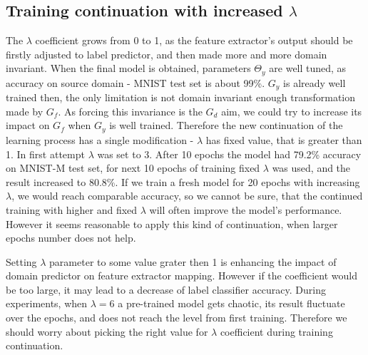 \documentclass{article}
\begin{document}
\subsection{Training continuation with increased $\lambda$}
The $\lambda$ coefficient grows from 0 to 1, as the feature extractor's output should be firstly adjusted to label predictor, and then made more and more domain invariant. When the final model is obtained, parameters $\Theta_{y}$ are well tuned, as accuracy on source domain - MNIST test set is about 99\%. $G_{y}$ is already well trained then, the only limitation is not domain invariant enough transformation made by $G_{f}$. As forcing this invariance is the $G_{d}$ aim, we could try to increase its impact on $G_{f}$ when $G_{y}$ is well trained. Therefore the new continuation of the learning process has a single modification - $\lambda$ has fixed value, that is greater than 1. In first attempt $\lambda$ was set to 3. After 10 epochs the model had 79.2\% accuracy on MNIST-M test set, for next 10 epochs of training fixed $\lambda$ was used, and the result increased to 80.8\%. If we train a fresh model for 20 epochs with increasing $\lambda$, we would reach comparable accuracy, so we cannot be sure, that the continued training with higher and fixed $\lambda$ will often improve the model's performance. However it seems reasonable to apply this kind of continuation, when larger epochs number does not help.
\par
Setting $\lambda$ parameter to some value grater then 1 is enhancing the impact of domain predictor on feature extractor mapping. However if the coefficient would be too large, it may lead to a decrease of label classifier accuracy. During experiments, when $\lambda = 6$ a pre-trained model gets chaotic, its result fluctuate over the epochs, and does not reach the level from first training. Therefore we should worry about picking the right value for $\lambda$ coefficient during training continuation.
\end{document}
